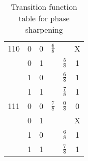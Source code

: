 \begin{center}
\begin{table}
\begin{tabular}{|c|c|c||c|c||c|}
110 & 0 & 0 & $\frac{6}{8}$ &               & X\\
    & 0 & 1 &               & $\frac{5}{8}$ & 1\\
    & 1 & 0 &               & $\frac{6}{8}$ & 1\\
    & 1 & 1 &               & $\frac{7}{8}$ & 1\\
\hline
111 & 0 & 0 & $\frac{7}{8}$ & $\frac{0}{8}$ & 0\\
    & 0 & 1 &               &               & X\\
    & 1 & 0 &               & $\frac{6}{8}$ & 1\\
    & 1 & 1 &               & $\frac{7}{8}$ & 1\\
\hline
\end{tabular}
\caption{Transition function table for phase sharpening}
\end{table}
\end{center}